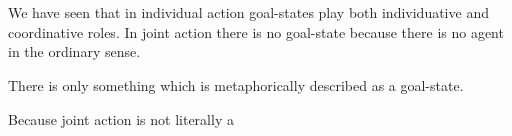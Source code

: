 \documentclass[12pt,a4paper]{extarticle}
\begin{document}
\section{}
We have seen that in individual action goal-states play both individuative and coordinative roles.  In joint action there is no goal-state because there is no agent in the ordinary sense.  

There is only something which is metaphorically described as a goal-state.

Because joint action is not literally a 


\end{document}
